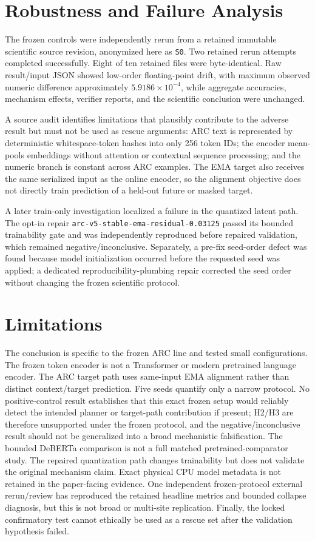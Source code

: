 \documentclass[twoside]{article}
\begin{document}
\section{Robustness and Failure Analysis}
The frozen controls were independently rerun from a retained immutable scientific source revision, anonymized here as \texttt{S0}. Two retained rerun attempts completed successfully. Eight of ten retained files were byte-identical. Raw result/input JSON showed low-order floating-point drift, with maximum observed numeric difference approximately $5.9186\times10^{-4}$, while aggregate accuracies, mechanism effects, verifier reports, and the scientific conclusion were unchanged.

A source audit identifies limitations that plausibly contribute to the adverse result but must not be used as rescue arguments: ARC text is represented by deterministic whitespace-token hashes into only 256 token IDs; the encoder mean-pools embeddings without attention or contextual sequence processing; and the numeric branch is constant across ARC examples. The EMA target also receives the same serialized input as the online encoder, so the alignment objective does not directly train prediction of a held-out future or masked target.

A later train-only investigation localized a failure in the quantized latent path. The opt-in repair \texttt{arc-v5-stable-ema-residual-0.03125} passed its bounded trainability gate and was independently reproduced before repaired validation, which remained negative/inconclusive. Separately, a pre-fix seed-order defect was found because model initialization occurred before the requested seed was applied; a dedicated reproducibility-plumbing repair corrected the seed order without changing the frozen scientific protocol.

\section{Limitations}
The conclusion is specific to the frozen ARC line and tested small configurations. The frozen token encoder is not a Transformer or modern pretrained language encoder. The ARC target path uses same-input EMA alignment rather than distinct context/target prediction. Five seeds quantify only a narrow protocol. No positive-control result establishes that this exact frozen setup would reliably detect the intended planner or target-path contribution if present; H2/H3 are therefore unsupported under the frozen protocol, and the negative/inconclusive result should not be generalized into a broad mechanistic falsification. The bounded DeBERTa comparison is not a full matched pretrained-comparator study. The repaired quantization path changes trainability but does not validate the original mechanism claim. Exact physical CPU model metadata is not retained in the paper-facing evidence. One independent frozen-protocol external rerun/review has reproduced the retained headline metrics and bounded collapse diagnosis, but this is not broad or multi-site replication. Finally, the locked confirmatory test cannot ethically be used as a rescue set after the validation hypothesis failed.
\end{document}
